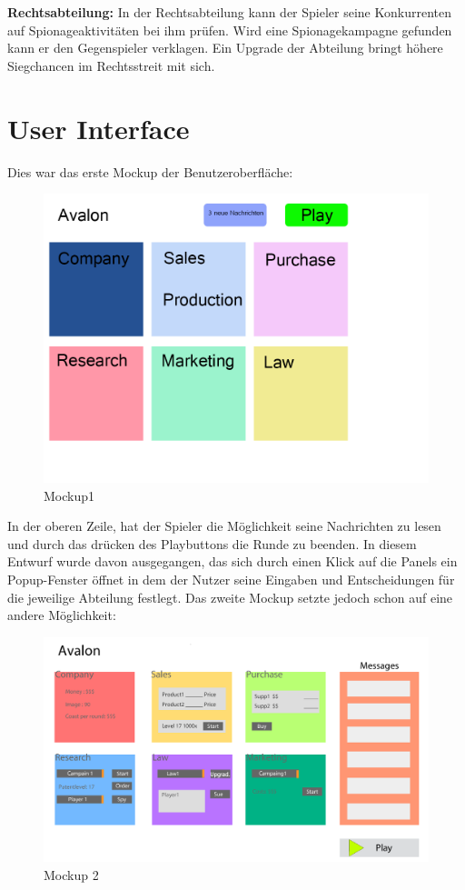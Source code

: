 \textbf{Rechtsabteilung:} 
In der Rechtsabteilung kann der Spieler seine Konkurrenten auf Spionageaktivitäten bei ihm prüfen. Wird eine Spionagekampagne gefunden kann er den Gegenspieler verklagen. Ein Upgrade der Abteilung bringt höhere Siegchancen im Rechtsstreit mit sich.

\section{User Interface}
Dies war das erste Mockup der Benutzeroberfläche:

\begin{figure}
\centering
\includegraphics[width=0.7\linewidth]{../images/mockup1}
\caption{Mockup1}
\label{fig:mockup1}
\end{figure}


In der oberen Zeile, hat der Spieler die Möglichkeit seine Nachrichten zu lesen und durch das drücken des Playbuttons die Runde zu beenden. In diesem Entwurf wurde davon ausgegangen, das sich durch einen Klick auf die Panels ein Popup-Fenster öffnet in dem der Nutzer seine Eingaben und Entscheidungen für die jeweilige Abteilung festlegt.  Das zweite Mockup setzte jedoch schon auf eine andere Möglichkeit:

\begin{figure}
\centering
\includegraphics[width=0.7\linewidth]{../images/mockup2}
\caption{Mockup 2}
\label{fig:mockup2}
\end{figure}

